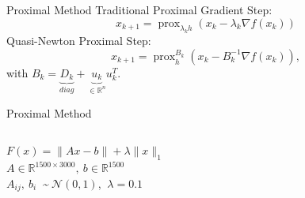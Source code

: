 \documentclass[10pt]{beamer}
\DeclareMathOperator{\prox}{prox}
\begin{document}
   \begin{frame}{Proximal Method}
   	\alert{Traditional Proximal Gradient Step:}
   	\begin{equation*}
   	x_{k+1} = \prox_{\lambda_kh}(x_k - \lambda_k\nabla f(x_k))
   	\end{equation*}
   	\alert{Quasi-Newton Proximal Step:}
   	\begin{equation*}
   	x_{k+1} = \prox_h^{B_k}(x_k - B_k^{-1}\nabla f(x_k)),
   	\end{equation*}
   	with $B_k = \underbrace{D_k}_{diag} + \underbrace{u_k}_{\in\mathbb{R}^n}u_k^T$.
   \end{frame}
   
   \begin{frame}{Proximal Method}
   	\begin{columns}[T]
   		\begin{column}{.5\textwidth}
   			$F(x) = \lVert Ax - b \rVert + \lambda \lVert x \rVert_1$\\
   			$A \in \mathbb{R}^{1500 \times 3000},\:b \in \mathbb{R}^{1500}$\\
   			$A_{ij},\:b_i\:$ \textasciitilde $\:\mathcal{N}(0,1)$, $\:\lambda = 0.1$\\
   			\vspace{15pt}
   			\resizebox{\linewidth}{!}{}
   			\begin{center}
   				\hspace{-3pt}
\end{center}
\end{column}
\end{columns}
\end{frame}
\end{document}
